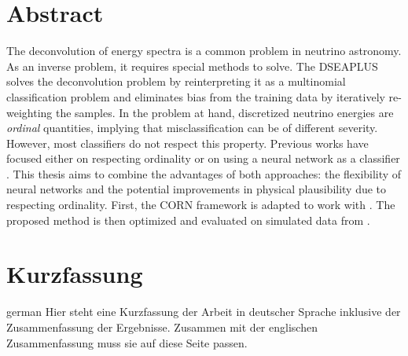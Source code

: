 \thispagestyle{plain}

\section*{Abstract}
The deconvolution of energy spectra is a common problem in neutrino astronomy.
As an inverse problem,
  it requires special methods to solve.
The \acf{DSEAPLUS} \cite{dsea_unification}
solves the deconvolution problem
  by reinterpreting it as a multinomial classification problem
and eliminates bias from the training data
  by iteratively re-weighting the samples.
%
In the problem at hand,
  discretized neutrino energies are \emph{ordinal} quantities,
    implying that misclassification can be of different severity.
However,
  most classifiers do not respect this property.
Previous works
have focused either
  on respecting ordinality \cite{dsea_jan}
  or on using a neural network as a classifier \cite{dsea_samuel}.
This thesis aims to combine the advantages of both approaches:
  the flexibility of neural networks
  and the potential improvements in physical plausibility
    due to respecting ordinality.
First,
the \ac{CORN} framework \cite{corn} is adapted to work with \dsea{}.
The proposed method is then optimized and evaluated
  on simulated data from \icecube{}.


\acresetall %
\section*{Kurzfassung}
\begin{foreignlanguage}{german}
Hier steht eine Kurzfassung der Arbeit in deutscher Sprache inklusive der Zusammenfassung der
Ergebnisse.
Zusammen mit der englischen Zusammenfassung muss sie auf diese Seite passen.

\blindtext[1]
\end{foreignlanguage}


